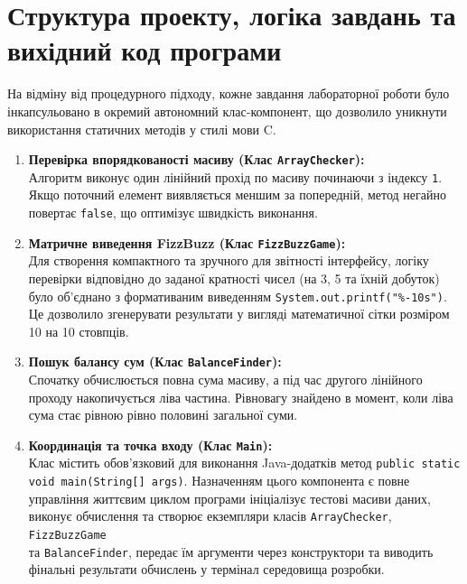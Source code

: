 \section{Структура проекту, логіка завдань та вихідний код програми}

На відміну від процедурного підходу, кожне завдання лабораторної роботи було інкапсульовано 
в окремий автономний клас-компонент, що дозволило уникнути використання статичних методів у стилі мови C.

\begin{enumerate}
    \item \textbf{Перевірка впорядкованості масиву (Клас \texttt{ArrayChecker}):} 
    \\Алгоритм виконує один лінійний прохід по масиву починаючи з індексу \texttt{1}. 
    Якщо поточний елемент виявляється меншим за попередній, метод негайно повертає \texttt{false}, 
    що оптимізує швидкість виконання.
    \item \textbf{Матричне виведення FizzBuzz (Клас \texttt{FizzBuzzGame}):} 
    \\Для створення компактного та зручного для звітності інтерфейсу, логіку перевірки 
    відповідно до заданої кратності чисел (на 3, 5 та їхній добуток) було об'єднано з 
    формативаним виведенням \texttt{System.out.printf("\%-10s")}. Це дозволило згенерувати 
    результати у вигляді математичної сітки розміром 10 на 10 стовпців.
    \item \textbf{Пошук балансу сум (Клас \texttt{BalanceFinder}):} 
    \\Спочатку обчислюється повна сума 
    масиву, а під час другого лінійного проходу накопичується ліва частина. Рівновагу 
    знайдено в момент, коли ліва сума стає рівною рівно половині загальної суми.
    \item \textbf{Координація та точка входу (Клас \texttt{Main}):} 
    \\Клас містить обов'язковий для виконання Java-додатків метод \texttt{public static void main(String[] args)}. 
    Назначенням цього компонента є повне управління життєвим циклом програми ініціалізує тестові масиви даних, 
    виконує обчислення та створює екземпляри класів \texttt{ArrayChecker}, \texttt{FizzBuzzGame} \\
    та \texttt{BalanceFinder}, передає їм аргументи через конструктори та виводить фінальні результати обчислень у термінал середовища розробки.
\end{enumerate}


